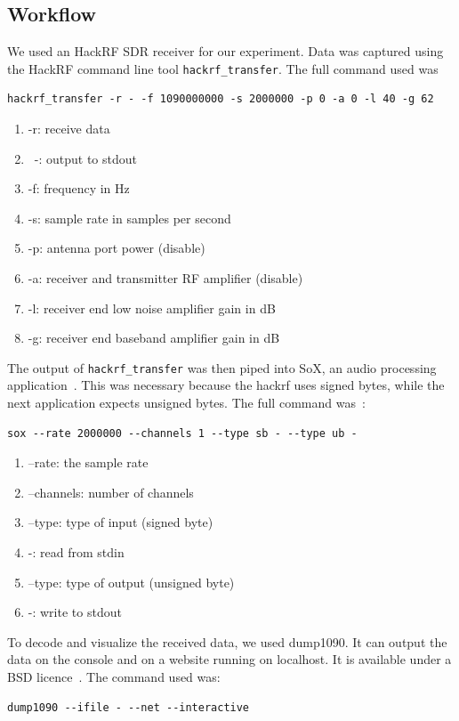 \documentclass[conference]{IEEEtran}
\begin{document}
\subsection{Workflow}
We used an HackRF SDR receiver for our experiment. Data was captured using the HackRF command line tool \lstinline|hackrf_transfer|. The full command used was
\begin{lstlisting}
hackrf_transfer -r - -f 1090000000 -s 2000000 -p 0 -a 0 -l 40 -g 62
\end{lstlisting}
\begin{enumerate}
	\item -r: receive data
	\item ~-: output to stdout
	\item -f: frequency in Hz
	\item -s: sample rate in samples per second
	\item -p: antenna port power (disable)
	\item -a: receiver and transmitter RF amplifier (disable)
	\item -l: receiver end low noise amplifier gain in dB
	\item -g: receiver end baseband amplifier gain in dB
\end{enumerate}
The output of \lstinline|hackrf_transfer| was then piped into SoX, an audio processing application~\cite{SoX19}. This was necessary because the hackrf uses signed bytes, while the next application expects unsigned bytes. The full command was~\cite{Medium19ADS-B}:
\begin{lstlisting}
sox --rate 2000000 --channels 1 --type sb - --type ub -
\end{lstlisting}
\begin{enumerate}
	\item --rate: the sample rate
	\item --channels: number of channels
	\item --type: type of input (signed byte)
	\item -: read from stdin
	\item --type: type of output (unsigned byte)
	\item -: write to stdout
\end{enumerate}
To decode and visualize the received data, we used dump1090. It can output the data on the console and on a website running on localhost. It is available under a BSD licence~\cite{dump109019Github}. The command used was:
\begin{lstlisting}
dump1090 --ifile - --net --interactive
\end{lstlisting}
\end{document}
